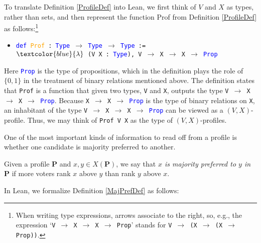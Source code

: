 \documentclass[runningheads]{llncs}
\begin{document}
To translate Definition \ref{ProfileDef} into Lean, we first think of $V$ and $X$ as types, rather than sets, and then represent the function \textsf{Prof} from Definition \ref{ProfileDef} as follows:\footnote{When writing type expressions, arrows associate to the right, so, e.g., the expression  `\texttt{V $\to$ X $\to$ X $\to$ Prop}' stands for \texttt{V $\to$ (X $\to$ (X $\to$ Prop))}.}
\begin{itemize}
\item[] \texttt{\textcolor{blue}{def} \textcolor{orange}{Prof} : \textcolor{blue}{Type} $\to$ \textcolor{blue}{Type} $\to$ \textcolor{blue}{Type} := }\\\texttt{$\textcolor{blue}{\lambda}$ (V X : \textcolor{blue}{Type}), V $\to$ X $\to$ X $\to$ \textcolor{blue}{Prop}}
\end{itemize}
Here \textcolor{blue}{\texttt{Prop}} is the type of propositions, which in the definition plays the role of $\{0,1\}$ in the treatment of binary relations mentioned above.  The definition states that \texttt{Prof} is a function that given two types, \texttt{V} and \texttt{X}, outputs the type \texttt{V $\to$ X $\to$ X $\to$ \textcolor{blue}{Prop}}. Because \texttt{X $\to$ X $\to$ \textcolor{blue}{Prop}} is the type of binary relations on \texttt{X}, an inhabitant of the type \texttt{V $\to$ X $\to$ X $\to$ \textcolor{blue}{Prop}} can be viewed as a $(V,X)$-profile. Thus, we may think of \texttt{Prof V X} as the type of $(V,X)$-profiles.

One of the most important kinds of information to read off from a profile is whether one candidate is majority preferred to another.

\begin{definition}\label{MajPrefDef} \textnormal{Given a profile $\mathbf{P}$ and $x,y\in X(\mathbf{P})$, we say that \textit{$x$ is majority preferred to $y$ in $\mathbf{P}$} if more voters rank $x$ above $y$ than rank $y$ above $x$.}\end{definition}

In Lean, we formalize Definition \ref{MajPrefDef} as follows:
\end{document}
